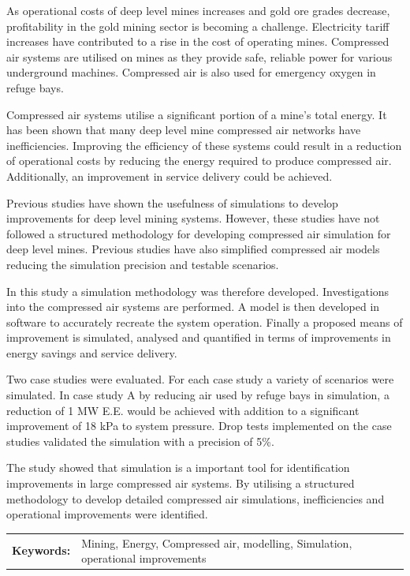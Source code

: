 \documentclass[12pt, english, oneside, open=any]{report}
\begin{document}
	 As operational costs of deep level mines increases and gold ore grades decrease, profitability in the gold mining sector is becoming a challenge. Electricity tariff increases have contributed to a rise in the cost of operating mines. Compressed air systems are utilised on mines as they provide safe, reliable  power for various underground machines. Compressed air is also used for emergency oxygen in refuge bays.
	 \par
	 Compressed air systems utilise a significant portion of a mine's total energy. It has been shown that many deep level mine compressed air networks have inefficiencies. Improving the efficiency of these systems could result in a reduction of operational costs by reducing the energy required to produce compressed air. Additionally, an improvement in service delivery could be achieved. 
	 \par
	Previous studies have shown the usefulness of simulations to develop improvements for deep level mining systems. However, these studies have not followed a structured methodology for developing compressed air simulation for deep level mines. Previous studies have also simplified compressed air models reducing the simulation precision and testable scenarios. 
	\par
	 In this study a simulation methodology was therefore developed. Investigations into the compressed air systems are performed. A model is then developed in software to accurately recreate the system operation. Finally a proposed means of improvement is simulated, analysed and quantified in terms of improvements in energy savings and service delivery.
	 \par
	 Two case studies were evaluated. For each case study a variety of scenarios were simulated. In case study A by reducing air used by refuge bays in simulation, a reduction of 1 MW E.E. would be achieved with addition to a significant improvement of 18 kPa to system pressure. Drop tests implemented on the case studies validated the simulation with a precision of 5\%. 
	 \par
	 The study showed that simulation is a important tool for identification improvements in large compressed air systems. By utilising a structured methodology to develop detailed compressed air simulations, inefficiencies and operational improvements were identified.   
	 \par
	\begin{tabular}{p{2.35cm}p{13.35cm}}
		\textbf{Keywords:} & Mining, Energy, Compressed air, modelling, Simulation, operational improvements  \\
	\end{tabular}
\clearpage
\end{document}
